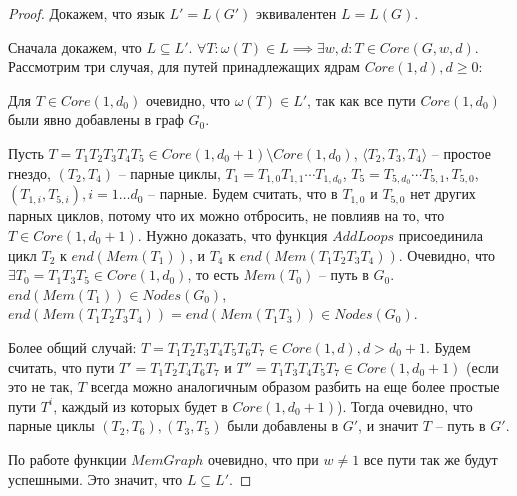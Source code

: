 \begin{proof}
    Докажем, что язык $L' = L(G')$ эквивалентен $L = L(G)$.
    
    Сначала докажем, что $L \subseteq L'$.
    $\forall T : \omega(T) \in L \implies \exists w, d : T \in Core(G, w, d)$.
    Рассмотрим три случая, для путей принадлежащих ядрам $Core(1, d), d \geq 0$:

    Для $T \in Core(1, d_0)$ очевидно, что $\omega(T) \in L'$, так как все пути $Core(1, d_0)$ были явно добавлены в граф $G_0$.

    Пусть $T = T_1 T_2 T_3 T_4 T_5 \in Core(1, d_0 + 1) \setminus Core(1, d_0)$, 
    $\langle T_2, T_3, T_4 \rangle$ -- простое гнездо, $(T_2, T_4)$ -- парные циклы,
    $T_1 = T_{1, 0} T_{1, 1} \cdots T_{1, d_0}$,
    $T_5 = T_{5, d_0} \cdots T_{5, 1}, T_{5, 0}$,
    $(T_{1, i}, T_{5, i}), i = 1 \dots d_0$ -- парные.
    Будем считать, что в $T_{1,0}$ и $T_{5,0}$ нет других парных циклов,
    потому что их можно отбросить, не повлияв на то, что $T \in Core(1, d_0+1)$. 
    Нужно доказать, что функция $AddLoops$ присоединила цикл $T_2$ к $end(Mem(T_1))$, 
    и $T_4$ к $end(Mem(T_1 T_2 T_3 T_4))$.
    Очевидно, что $\exists T_0 = T_1 T_3 T_5 \in Core(1, d_0)$, то есть $Mem(T_0)$ -- путь в $G_0$. 
    $end(Mem(T_1)) \in Nodes(G_0)$, $end(Mem(T_1 T_2 T_3 T_4)) = end(Mem(T_1 T_3)) \in Nodes(G_0)$.

    Более общий случай: $T = T_1 T_2 T_3 T_4 T_5 T_6 T_7\in Core(1, d), d > d_0 + 1$.
    Будем считать, что пути $T' = T_1 T_2 T_4 T_6 T_7$ и $T'' = T_1 T_3 T_4 T_5 T_7 \in Core(1, d_0+1)$
    (если это не так, $T$ всегда можно аналогичным образом разбить на еще более простые пути $T^i$,
    каждый из которых будет в $Core(1, d_0+1)$).
    Тогда очевидно, что парные циклы $(T_2,T_6), (T_3,T_5)$ были добавлены в $G'$, и значит $T$ -- путь в $G'$. 

    По работе функции $MemGraph$ очевидно, что при $w \neq 1$ все пути так же будут успешными.
    Это значит, что $L \subseteq L'$.


\end{proof}
